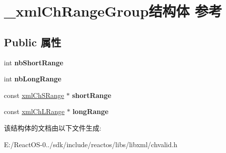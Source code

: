 \hypertarget{struct__xml_ch_range_group}{}\section{\+\_\+xml\+Ch\+Range\+Group结构体 参考}
\label{struct__xml_ch_range_group}
\subsection*{Public 属性}
\begin{DoxyCompactItemize}
\item 
\mbox{\label{struct__xml_ch_range_group_a586ec6ff0df5781a799120268c917581}} 
int {\bfseries nb\+Short\+Range}
\item 
\mbox{\label{struct__xml_ch_range_group_a8c00ae5937f0d5489444fd8c264f7640}} 
int {\bfseries nb\+Long\+Range}
\item 
\mbox{\label{struct__xml_ch_range_group_aedd6b0cbe54821910877e37a34c6ab38}} 
const \hyperlink{struct__xml_ch_s_range}{xml\+Ch\+S\+Range} $\ast$ {\bfseries short\+Range}
\item 
\mbox{\label{struct__xml_ch_range_group_a17b011e8ac3510579c3f59bc82960c34}} 
const \hyperlink{struct__xml_ch_l_range}{xml\+Ch\+L\+Range} $\ast$ {\bfseries long\+Range}
\end{DoxyCompactItemize}


该结构体的文档由以下文件生成\+:\begin{DoxyCompactItemize}
\item 
E\+:/\+React\+O\+S-\/0../sdk/include/reactos/libs/libxml/chvalid.\+h\end{DoxyCompactItemize}
